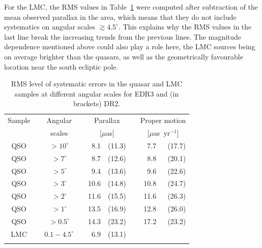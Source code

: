 \documentclass[longauth]{aa} %
\begin{document}
For the LMC, the RMS values in Table~\ref{tab:rmsSyst} were computed after subtraction 
of the mean observed parallax in the area, which means that they do not include 
systematics on angular scales $\gtrsim 4.5^\circ$. This explains why the
RMS values in the last line break the increasing trends from the previous lines. 
The magnitude dependence mentioned above could also play a role here, the
LMC sources being on average brighter than the quasars, as well as the geometrically 
favourable location near the south ecliptic pole.


\begin{table}
\caption{RMS level of systematic errors in the quasar and LMC
samples at different angular scales for EDR3 and (in brackets) DR2.  
\label{tab:rmsSyst}}
\small
\begin{tabular}{cccrrrrrr}
\hline\hline
\noalign{\smallskip}
Sample && Angular && \multicolumn{2}{c}{Parallax} && \multicolumn{2}{c}{Proper motion}\\
&& scales &&  \multicolumn{2}{c}{[$\mu$as]} && \multicolumn{2}{c}{[$\mu$as~yr$^{-1}$]} \\
\noalign{\smallskip}
\hline
\noalign{\smallskip}
QSO && $>10^\circ$ && 8.1 & (11.3) && 7.7 & (17.7)\\
QSO && $>7^\circ$ && 8.7 & (12.6) &&  8.8 & (20.1)\\
QSO && $>5^\circ$ && 9.4 & (13.6) && 9.6 & (22.6)\\
QSO && $>3^\circ$ && 10.6 & (14.8) && 10.8 & (24.7)\\
QSO && $>2^\circ$ && 11.6 & (15.5) && 11.6 & (26.3)\\
QSO && $>1^\circ$ && 13.5 & (16.9) && 12.8 & (26.0)\\
QSO && $>0.5^\circ$ && 14.3 & (23.2) && 17.2 & (23.2)\\
LMC && $0.1{-}4.5^\circ$ && 6.9 & (13.1)\\
\noalign{\smallskip}
\hline
\end{tabular}
\end{table}
\end{document}
